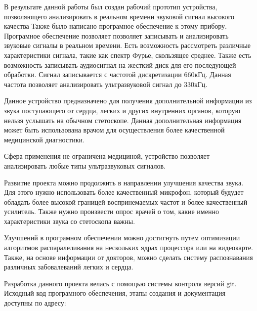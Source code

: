 \documentclass[../paper.tex]{subfiles}
\begin{document}
В результате данной работы был создан рабочий прототип устройства, позволяющего анализировать в реальном времени звуковой сигнал высокого качества Также было написано програмное обеспечение к этому прибору. Програмное обеспечение позволяет позволяет записывать и анализировать звуковые сигналы в реальном времени. Есть возможность рассмотреть различные характеристики сигнала, такие как спектр Фурье, скользящее среднее. Также есть возможность записывать аудиосигнал на жесткий диск для его последующей обработки. Сигнал записывается с частотой дискретизации 660кГц. Данная частота позволяет анализировать ультразвуковой сигнал до 330кГц.

Данное устройство предназначено для получения дополнительной информации из звука поступающего от сердца, легких и других внутренних органов, которую нельзя услышать на обычном стетоскопе. Данная дополнительная информация может быть использована врачом для осуществления более качественной медицинской диагностики.

Сфера применения не ограничена медициной, устройство позволяет анализировать любые типы ультразвуковых сигналов.

Развитие проекта можно продолжить в направлении улучшения качества звука. Для этого нужно использовать более качественный микрофон, который будудет обладать более высокой границей воспринемаемых частот и более качественный усилитель. Также нужно произвести опрос врачей о том, какие именно характеристики звука со стетоскопа важны.

Улучшений в програмном обеспечении можно достигнуть путем оптимизации алгоритмов распаралеливания на нескольких ядрах процессора или на видеокарте. Также, на основе информации от докторов, можно сделать систему распознавания различных забовалеваний легких и сердца.

Разработка данного проекта велась с помощью системы контроля версий git. Исходный код програмного обеспечения, этапы создания и документация доступны по адресу: \cite{github}
\end{document}
